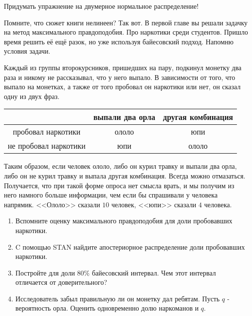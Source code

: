 \begin{problem}
	Придумать упражнение на двумерное нормальное распределение! 
	\begin{sol}
		
	\end{sol}
\end{problem}


\begin{problem}
Помните, что сюжет книги нелинеен? Так вот. В первой главе вы решали задачку на метод максимального правдоподобия. Про наркотики среди студентов. Пришло время решить её ещё разок, но уже используя байесовский подход. Напомню условия задачи.  

Каждый из группы второкурсников, пришедших на пару, подкинул монетку два раза и никому не рассказывал, что у него выпало. В зависимости от того, что выпало на монетках, а также от того пробовал он наркотики или нет, он сказал одну из двух фраз.

\begin{center}
	\begin{tabular}{c|c|c}
		&  выпали два орла   & другая комбинация   \\ \hline
		пробовал наркотики      &   ололо                     &   юпи       \\ \hline
		не пробовал наркотики &	  юпи	                     &   ололо      \\
	\end{tabular}
\end{center}

Таким образом, если человек ололо, либо он курил травку и выпали два орла, либо он не курил травку и выпала другая комбинация. Всегда можно отмазаться. Получается, что при такой форме опроса нет смысла врать, и мы получим из него намного больше информации, чем если бы спрашивали у человека напрямик.  <<Ололо>> сказали $10$ человек, <<юпи>> сказали $4$ человека.

\begin{enumerate}
	\item  Вспомните оценку максимального правдоподобия для доли пробовавших наркотики. 
	\item  C помощью STAN найдите апостериорное распределение доли пробовавших наркотики. 
	\item  Постройте для доли $80\%$ байесовский интервал. Чем этот интервал отличается от доверительного? 
	\item  Исследователь забыл правильную ли он монетку дал ребятам. Пусть $q$ - вероятность орла. Оценить одновременно долю наркоманов и $q$. 
\end{enumerate}


\end{problem}
